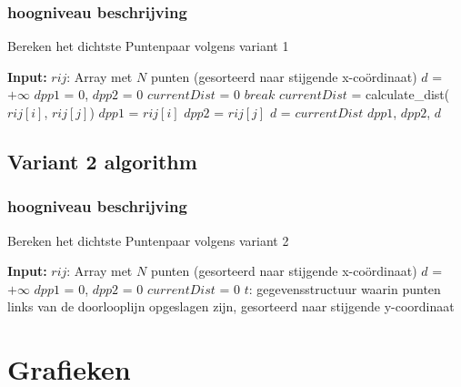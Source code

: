 \documentclass[12pt]{article}
\begin{document}
\subsubsection{hoogniveau beschrijving}


\begin{algorithm}
\caption{Bereken het dichtste Puntenpaar volgens variant 1}
\begin{algorithmic}
	\STATE \textbf{Input:}  $rij$: Array met $N$ punten (gesorteerd naar stijgende x-co\"ordinaat)
	\STATE $d$ = $+\infty$
	\STATE $dpp1$ = 0, $dpp2$ = 0
	\STATE $currentDist$ = 0
			\STATE $break$
		\ENDIF
		\STATE $currentDist$ = calculate\_dist($rij[i]$, $rij[j]$)
				\STATE $dpp1$ = $rij[i]$
				\STATE $dpp2$ = $rij[j]$
				\STATE $d$ = $currentDist$
			\ENDIF
		\ENDFOR
	\ENDFOR
	\RETURN $dpp1$, $dpp2$, $d$
\end{algorithmic}
\end{algorithm}

\subsection{Variant 2 algorithm}
\subsubsection{hoogniveau beschrijving}

\begin{algorithm}
\caption{Bereken het dichtste Puntenpaar volgens variant 2}
\begin{algorithmic}
	\STATE \textbf{Input:}  $rij$: Array met $N$ punten (gesorteerd naar stijgende x-co\"ordinaat)
	\STATE $d$ = $+\infty$
	\STATE $dpp1$ = 0, $dpp2$ = 0
	\STATE $currentDist$ = 0
	\STATE $t$: gegevensstructuur waarin punten links van de doorlooplijn opgeslagen zijn, gesorteerd naar stijgende y-coordinaat


\end{algorithmic}
\end{algorithm}

\section{Grafieken}
\end{document}
